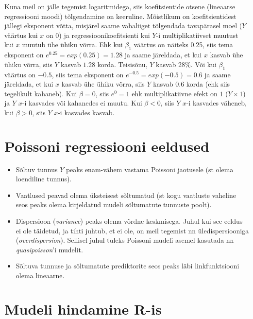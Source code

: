 \documentclass[
]{book}
\providecommand{\tightlist}{%
  \setlength{\itemsep}{0pt}\setlength{\parskip}{0pt}}
\begin{document}
Kuna meil on jälle tegemist logaritmidega, siis koefitsientide otsene (lineaarse regressiooni moodi) tõlgendamine on keeruline. Mõistlikum on koefitsientidest jällegi eksponent võtta, misjärel saame vabaliiget tõlgendada tavapärasel moel (\(Y\) väärtus kui \(x\) on \(0\)) ja regressioonikoefitsienti kui \(Y\)-i multiplikatiivset muutust kui \(x\) muutub ühe ühiku võrra. Ehk kui \(\beta_1\) väärtus on näiteks 0.25, siis tema eksponent on \(e^{0.25} = exp(0.25) = 1.28\) ja saame järeldada, et kui \(x\) kasvab ühe ühiku võrra, siis \(Y\) kasvab \(1.28\) korda. Teisisõnu, \(Y\) kasvab \(28\%\). Või kui \(\beta_1\) väärtus on \(-0.5\), siis tema eksponent on \(e^{-0.5} = exp(-0.5) = 0.6\) ja saame järeldada, et kui \(x\) kasvab ühe ühiku võrra, siis \(Y\) kasvab \(0.6\) korda (ehk siis tegelikult kahaneb). Kui \(\beta = 0\), siis \(e^{0} = 1\) ehk multiplikatiivne efekt on \(1\) (\(Y\times1\)) ja \(Y\) \(x\)-i kasvades või kahanedes ei muutu. Kui \(\beta < 0\), siis \(Y\) \(x\)-i kasvades väheneb, kui \(\beta > 0\), siis \(Y\) \(x\)-i kasvades kasvab.

\hypertarget{poissoni-regressiooni-eeldused}{%
\section{Poissoni regressiooni eeldused}\label{poissoni-regressiooni-eeldused}}

\begin{itemize}
\tightlist
\item
  Sõltuv tunnus \(Y\) peaks enam-vähem vastama Poissoni jaotusele (st olema loendiline tunnus).
\item
  Vaatlused peavad olema üksteisest sõltumatud (st kogu vaatluste vaheline seos peaks olema kirjeldatud mudeli sõltumatute tunnuste poolt).
\item
  Dispersioon (\emph{variance}) peaks olema võrdne keskmisega. Juhul kui see eeldus ei ole täidetud, ja tihti juhtub, et ei ole, on meil tegemist nn üledispersiooniga (\emph{overdispersion}). Sellisel juhul tuleks Poissoni mudeli asemel kasutada nn \emph{quasipoisson}'i mudelit.
\item
  Sõltuva tunnuse ja sõltumatute prediktorite seos peaks läbi linkfunktsiooni olema lineaarne.
\end{itemize}

\hypertarget{mudeli-hindamine-r-is}{%
\section{Mudeli hindamine R-is}\label{mudeli-hindamine-r-is}}
\end{document}
